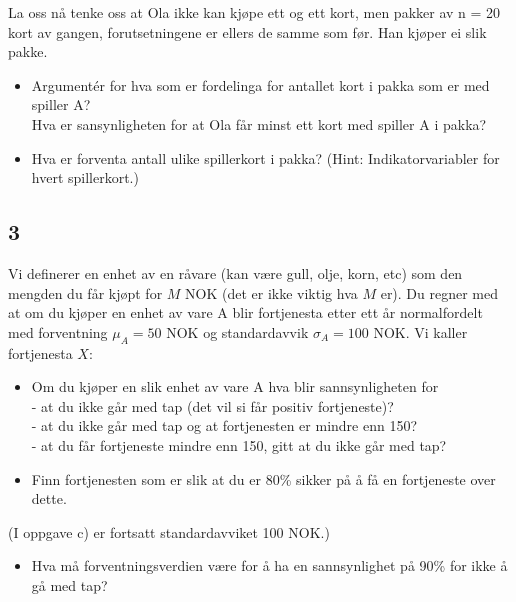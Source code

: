 \documentclass[10pt,a4paper]{article}
\begin{document}
La oss n{\aa} tenke oss at Ola ikke kan kjøpe ett og ett kort, men pakker av n = 20
kort av gangen, forutsetningene er ellers de samme som f{\o}r. Han kjøper ei slik
pakke.
\begin{itemize}
\item[d)] 
Argument\'er for hva som er fordelinga for antallet kort i pakka som er med spiller A?
\\
Hva er sansynligheten for at Ola f{\aa}r minst ett kort med spiller A i pakka?
\item[e)]
Hva er forventa antall ulike spillerkort i pakka? (Hint: Indikatorvariabler
for hvert spillerkort.)
\end{itemize}



\subsection*{3}
Vi definerer en enhet av en r{\aa}vare (kan v{\ae}re gull, olje, korn, etc)
som den mengden du f{\aa}r kj{\o}pt for $M$ NOK (det er ikke viktig hva $M$ er).
Du regner med at om du kj{\o}per en enhet av vare A
blir fortjenesta etter ett {\aa}r normalfordelt
med forventning $\mu_A=50$ NOK og standardavvik $\sigma_A=100$ NOK.
Vi kaller fortjenesta $X$:
\begin{itemize}
\item[a)]
Om du kj{\o}per en slik enhet av vare A hva blir sannsynligheten for
\\
- at du ikke g{\aa}r med tap (det vil si f{\aa}r positiv fortjeneste)?
\\
- at du ikke g{\aa}r med tap og at fortjenesten er mindre enn 150? 
\\
- at du f{\aa}r fortjeneste mindre enn 150, 
gitt at du ikke g{\aa}r med tap?
\end{itemize}
\begin{itemize}
\item[b)]
Finn fortjenesten som er slik at du er 80\% sikker p{\aa} {\aa} f{\aa} en fortjeneste over dette. 
\end{itemize}
(I oppgave c) er fortsatt standardavviket 100 NOK.)
\begin{itemize}
\item[c)]
Hva m{\aa} forventningsverdien v{\ae}re for {\aa} ha
en sannsynlighet p{\aa} 90\% for ikke {\aa} g{\aa} med tap?
\end{itemize}
\end{document}
